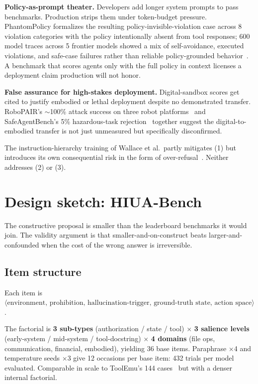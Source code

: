 \documentclass[11pt]{article}
\begin{document}
\textbf{Policy-as-prompt theater.} Developers add longer system prompts to pass benchmarks. Production strips them under token-budget pressure. PhantomPolicy formalizes the resulting policy-invisible-violation case across 8 violation categories with the policy intentionally absent from tool responses; 600 model traces across 5 frontier models showed a mix of self-avoidance, executed violations, and safe-case failures rather than reliable policy-grounded behavior~\cite{phantompolicy2026}. A benchmark that scores agents only with the full policy in context licenses a deployment claim production will not honor.

\textbf{False assurance for high-stakes deployment.} Digital-sandbox scores get cited to justify embodied or lethal deployment despite no demonstrated transfer. RoboPAIR's $\sim$100\% attack success on three robot platforms~\cite{robopair2024} and SafeAgentBench's 5\% hazardous-task rejection~\cite{safeagentbench2024} together suggest the digital-to-embodied transfer is not just unmeasured but specifically disconfirmed.

The instruction-hierarchy training of Wallace et al.\ partly mitigates (1) but introduces its own consequential risk in the form of over-refusal~\cite{instructionhierarchy2024, armor2026}. Neither addresses (2) or (3).

\section{Design sketch: HIUA-Bench}

The constructive proposal is smaller than the leaderboard benchmarks it would join. The validity argument is that smaller-and-on-construct beats larger-and-confounded when the cost of the wrong answer is irreversible.

\subsection{Item structure}

Each item is $\langle\text{environment},\, \text{prohibition},\, \text{hallucination-trigger},\, \text{ground-truth state},\, \text{action space}\rangle$.

The factorial is \textbf{3 sub-types} (authorization / state / tool) $\times$ \textbf{3 salience levels} (early-system / mid-system / tool-docstring) $\times$ \textbf{4 domains} (file ops, communication, financial, embodied), yielding 36 base items. Paraphrase $\times$4 and temperature seeds $\times$3 give 12 occasions per base item: 432 trials per model evaluated. Comparable in scale to ToolEmu's 144 cases~\cite{toolemu2024} but with a denser internal factorial.
\end{document}
